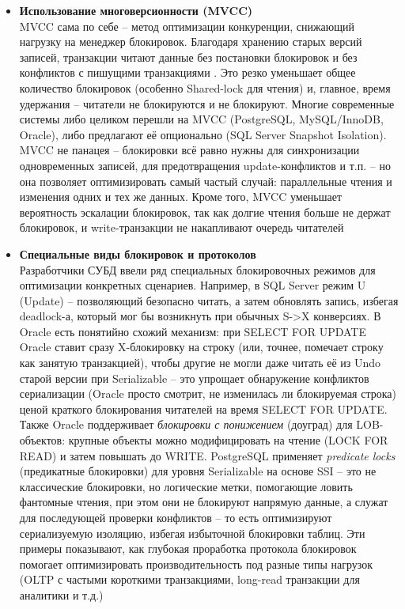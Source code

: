\begin{itemize}
    \item \textbf{Использование многоверсионности (MVCC)} ~\\
    MVCC сама по себе – метод оптимизации конкуренции, снижающий нагрузку на менеджер блокировок. Благодаря хранению старых версий записей, транзакции читают данные без постановки блокировок и без конфликтов с пишущими транзакциями \autocite{MicrosoftLearnSQLserverTransLock}. Это резко уменьшает общее количество блокировок (особенно Shared-lock для чтения) и, главное, время удержания – читатели не блокируются и не блокируют. Многие современные системы либо целиком перешли на MVCC (PostgreSQL, MySQL/InnoDB, Oracle), либо предлагают её опционально (SQL Server Snapshot Isolation). MVCC не панацея – блокировки всё равно нужны для синхронизации одновременных записей, для предотвращения update-конфликтов и т.п. – но она позволяет оптимизировать самый частый случай: параллельные чтения и изменения одних и тех же данных. Кроме того, MVCC уменьшает вероятность эскалации блокировок, так как долгие чтения больше не держат блокировок, и write-транзакции не накапливают очередь читателей
    \item \textbf{Специальные виды блокировок и протоколов} ~\\
    Разработчики СУБД ввели ряд специальных блокировочных режимов для оптимизации конкретных сценариев. Например, в SQL Server режим U (Update) – позволяющий безопасно читать, а затем обновлять запись, избегая deadlock-а, который мог бы возникнуть при обычных S->X конверсиях. В Oracle есть понятийно схожий механизм: при SELECT FOR UPDATE Oracle ставит сразу X-блокировку на строку (или, точнее, помечает строку как занятую транзакцией), чтобы другие не могли даже читать её из Undo старой версии при Serializable – это упрощает обнаружение конфликтов сериализации (Oracle просто смотрит, не изменилась ли блокируемая строка) ценой краткого блокирования читателей на время SELECT FOR UPDATE. Также Oracle поддерживает \textit{блокировки с понижением} (доуград) для LOB-объектов: крупные объекты можно модифицировать на чтение (LOCK FOR READ) и затем повышать до WRITE. PostgreSQL применяет \textit{predicate locks} (предикатные блокировки) для уровня Serializable на основе SSI – это не классические блокировки, но логические метки, помогающие ловить фантомные чтения, при этом они не блокируют напрямую данные, а служат для последующей проверки конфликтов – то есть оптимизируют сериализуемую изоляцию, избегая избыточной блокировки таблиц. Эти примеры показывают, как глубокая проработка протокола блокировок помогает оптимизировать производительность под разные типы нагрузок (OLTP с частыми короткими транзакциями, long-read транзакции для аналитики и т.д.)

\end{itemize}
